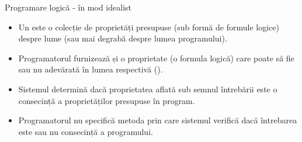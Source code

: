 \documentclass[xcolor=x11names,compress,10pt]{beamer}
\begin{document}






\begin{frame}{Programare logică - în mod idealist}
\begin{itemize}
	\item Un  este o colecție de proprietăți presupuse (sub formă de formule logice) despre lume (sau mai degrabă despre lumea programului).
	\medskip
	\item Programatorul furnizează și o proprietate (o formula logică) care poate să fie sau nu adevărată în lumea respectivă ().
	\medskip
	\item Sistemul determină dacă proprietatea aflată sub semnul întrebării este o consecință a proprietăților presupuse în program.
	\medskip
		\item Programatorul nu specifică metoda prin care sistemul verifică dacă întrebarea este sau nu consecință a programului.
\end{itemize}
\end{frame}

\end{document}
